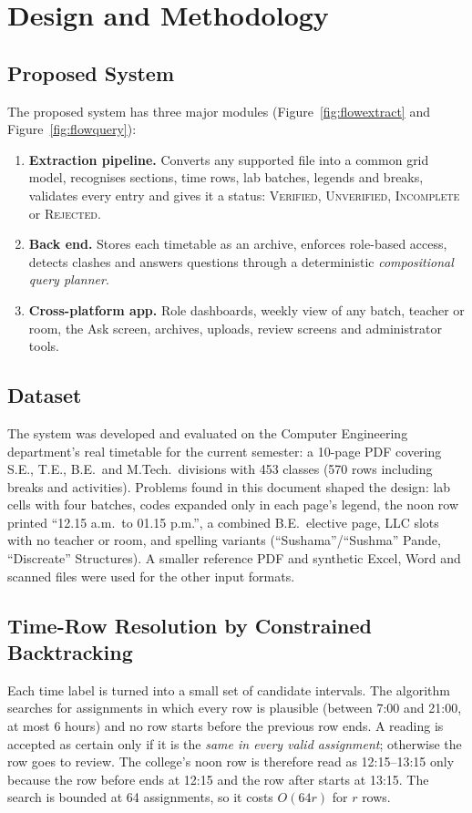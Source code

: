 \section{Design and Methodology}

\subsection{Proposed System}
The proposed system has three major modules (Figure~\ref{fig:flowextract} and Figure~\ref{fig:flowquery}):
\begin{enumerate}
\item \textbf{Extraction pipeline.} Converts any supported file into a common grid model, recognises
      sections, time rows, lab batches, legends and breaks, validates every entry and gives it a
      status: \textsc{Verified}, \textsc{Unverified}, \textsc{Incomplete} or \textsc{Rejected}.
\item \textbf{Back end.} Stores each timetable as an archive, enforces role-based access, detects
      clashes and answers questions through a deterministic \emph{compositional query planner}.
\item \textbf{Cross-platform app.} Role dashboards, weekly view of any batch, teacher or room, the
      Ask screen, archives, uploads, review screens and administrator tools.
\end{enumerate}


\subsection{Dataset}
The system was developed and evaluated on the Computer Engineering department's real timetable for
the current semester: a 10-page PDF covering S.E., T.E., B.E.\ and M.Tech.\ divisions with 453 classes
(570 rows including breaks and activities). Problems found in this document shaped the design: lab
cells with four batches, codes expanded only in each page's legend, the noon row printed
``12.15 a.m.\ to 01.15 p.m.'', a combined B.E.\ elective page, LLC slots with no teacher or room, and
spelling variants (``Sushama''/``Sushma'' Pande, ``Discreate'' Structures). A smaller reference PDF
and synthetic Excel, Word and scanned files were used for the other input formats.

\subsection{Time-Row Resolution by Constrained Backtracking}
Each time label is turned into a small set of candidate intervals. The algorithm searches for
assignments in which every row is plausible (between 7:00 and 21:00, at most 6 hours) and no row
starts before the previous row ends. A reading is accepted as certain only if it is the \emph{same in
every valid assignment}; otherwise the row goes to review. The college's noon row is therefore read as
12:15--13:15 only because the row before ends at 12:15 and the row after starts at 13:15. The search is
bounded at 64 assignments, so it costs $O(64r)$ for $r$ rows.


